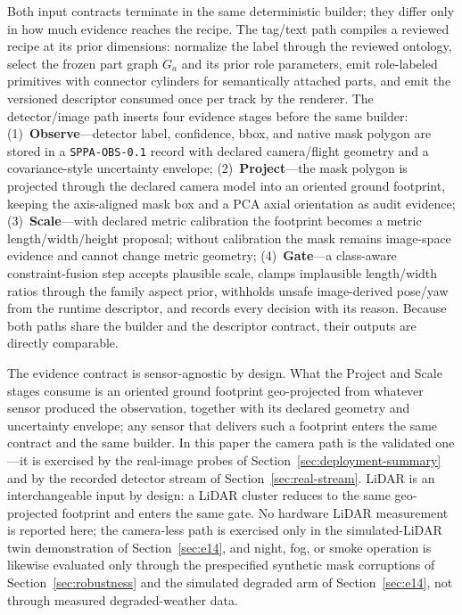 \documentclass[11pt,a4paper]{article}
\begin{document}
Both input contracts terminate in the same deterministic builder; they differ
only in how much evidence reaches the recipe. The tag/text path compiles a
reviewed recipe at its prior dimensions: normalize the label through the
reviewed ontology, select the frozen part graph \(G_a\) and its prior role
parameters, emit role-labeled primitives with connector cylinders for
semantically attached parts, and emit the versioned descriptor consumed once
per track by the renderer. The detector/image path inserts four evidence
stages before the same builder: (1)~\textbf{Observe}---detector label,
confidence, bbox, and native mask polygon are stored in a
\texttt{SPPA-OBS-0.1} record with declared camera/flight geometry and a
covariance-style uncertainty envelope; (2)~\textbf{Project}---the mask polygon
is projected through the declared camera model into an oriented ground
footprint, keeping the axis-aligned mask box and a PCA axial orientation as
audit evidence; (3)~\textbf{Scale}---with declared metric calibration the
footprint becomes a metric length/width/height proposal; without calibration
the mask remains image-space evidence and cannot change metric geometry;
(4)~\textbf{Gate}---a class-aware constraint-fusion step accepts plausible
scale, clamps implausible length/width ratios through the family aspect prior,
withholds unsafe image-derived pose/yaw from the runtime descriptor, and
records every decision with its reason. Because both paths share the builder
and the descriptor contract, their outputs are directly comparable.

The evidence contract is sensor-agnostic by design. What the Project and
Scale stages consume is an oriented ground footprint geo-projected from
whatever sensor produced the observation, together with its declared
geometry and uncertainty envelope; any sensor that delivers such a footprint
enters the same contract and the same builder. In this paper the camera path
is the validated one---it is exercised by the real-image probes of
Section~\ref{sec:deployment-summary} and by the recorded detector stream of
Section~\ref{sec:real-stream}. LiDAR is an interchangeable input by design:
a LiDAR cluster reduces to the same geo-projected footprint and enters the
same gate. No hardware LiDAR measurement is reported here; the camera-less
path is exercised only in the simulated-LiDAR twin demonstration of
Section~\ref{sec:e14}, and night, fog, or
smoke operation is likewise evaluated only through
the prespecified synthetic mask corruptions of
Section~\ref{sec:robustness} and the simulated degraded arm of
Section~\ref{sec:e14}, not through measured degraded-weather data.
\end{document}
